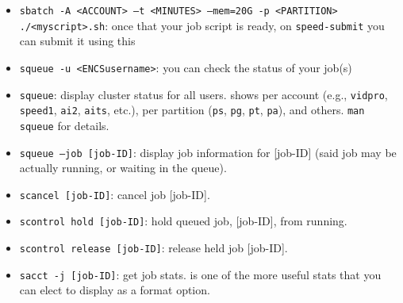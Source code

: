 \begin{itemize}
\item
\texttt{sbatch -A <ACCOUNT> --t <MINUTES> --mem=20G -p <PARTITION> ./<myscript>.sh}: once that your job script is ready,
on \texttt{speed-submit} you can submit it using this

\item
\texttt{squeue -u <ENCSusername>}: you can check the status of your job(s)

\item
\texttt{squeue}: display cluster status for all users. 
 shows per account (e.g., \texttt{vidpro},
\texttt{speed1}, \texttt{ai2}, \texttt{aits}, etc.),
 per partition (\texttt{ps}, \texttt{pg}, \texttt{pt}, \texttt{pa}),
and others. \texttt{man squeue} for details.

\item
\texttt{squeue --job [job-ID]}: display job information for [job-ID] (said job may be actually running, or waiting in the queue). 

\item
\texttt{scancel [job-ID]}: cancel job [job-ID]. 

\item
\texttt{scontrol hold [job-ID]}: hold queued job, [job-ID], from running. 

\item
\texttt{scontrol release [job-ID]}: release held job [job-ID]. 

\item
\texttt{sacct -j [job-ID]}: get job stats.
 is one of the more useful stats that you can elect to display
as a format option.


\end{itemize}
